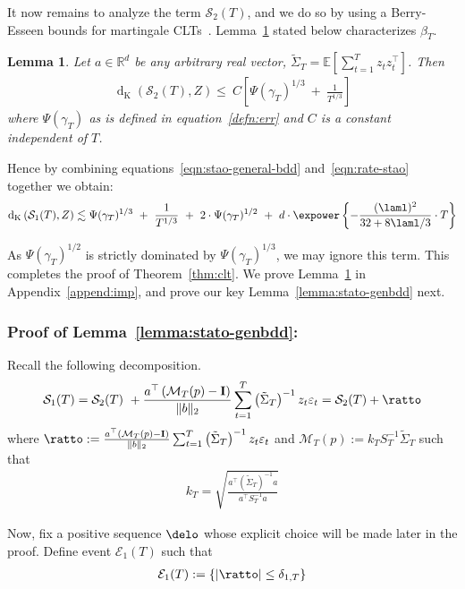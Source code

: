 \documentclass[11pt,letterpaper]{article}
\newcommand{\Exs}{\mathbb{E}}
\newcommand{\real}{\mathbb{R}}
\newcommand{\Id}{\mathbf{I}}
\newcommand{\z}{z}
\newcommand{\dist}{\operatorname{d}_{\operatorname{K}}}
\newcommand{\err}{\Psi(\gamma_T)}
\newcommand{\PT}{\tilde{\Sigma}_T}
\newcommand{\SigPinv}{ \left(\PT \right)^{-1}}
\newcommand{\mtp}{S_T^{-1} \PT}
\newcommand{\stao}{\mathcal{S}_1(T)}
\newcommand{\stato}{\mathcal{S}_2(T)}
\newcommand{\MTP}{\mathcal{M}_T(p)}
\newcommand{\Eone}{\mathcal{E}_1(T)}
\theoremstyle{plain}
\newtheorem{lemma}{Lemma}
\theoremstyle{definition}  %
\begin{document}
\noindent It now remains to analyze the term $\stato$, and we do so by using a Berry-Esseen bounds for martingale CLTs~\citep{mourrat2013rate}. Lemma~\ref{lemma:rate-stao} stated below characterizes $\beta_T$.
\begin{lemma}\label{lemma:rate-stao}
    Let $a\in \real^d$ be any arbitrary real vector, $\PT = \Exs[\sum^T_{t=1}\z_t \z^{\top}_t]$. Then
    \begin{align}\label{eqn:rate-stao}
    \dist \left(\stato,Z \right)
        \leq  \ C \left[ \Psi(\gamma_T)^{1/3} \ + \ \frac{1}{T^{1/3}}  \right]
    \end{align}
where $\err$ as is defined in equation~\eqref{defn:err} and $C$ is a constant independent of $T$.
\end{lemma}


\noindent Hence by combining equations~\eqref{eqn:stao-general-bdd} and~\eqref{eqn:rate-stao} together we obtain:
\begin{align*}
  \dist \left(\stao, Z \right)
  \lesssim \Psi(\gamma_T)^{1/3} \ + \ \frac{1}{T^{1/3}}
  \ + \ 2 \cdot \err^{1/2} \ + \  d \cdot \expower\left\{ - \frac{(\laml)^2}{32 +  8\laml/3} \cdot  T\right\}
\end{align*}

\noindent As $\err^{1/2}$ is strictly dominated by $\err^{1/3}$, we may ignore this term. This completes the proof of Theorem~\ref{thm:clt}. We prove Lemma~\ref{lemma:rate-stao} in Appendix~\ref{append:imp}, and prove our key Lemma~\ref{lemma:stato-genbdd} next.

\subsubsection*{Proof of Lemma~\ref{lemma:stato-genbdd}:}



\noindent Recall the following decomposition.
\begin{align} 
    \stao = \stato \ + \frac{a^{\top} \left(\MTP-\Id  \right)}{ \| b\|_2} \sum^T_{t=1} \SigPinv\z_t  \varepsilon_t 
    = \stato + \ratto
\end{align}
where $\ratto :=  \frac{a^{\top} \left(\MTP-\Id  \right)}{ \| b\|_2} \sum^T_{t=1} \SigPinv\z_t  \varepsilon_t $ and $\MTP := k_T \mtp$ such that
\begin{align*}
  k_T = \sqrt{ \frac{a^{\top} \SigPinv a }{ a^{\top} S_T^{-1} a}}  
\end{align*}


\noindent Now, fix a positive sequence $\delo$  whose explicit choice will be made later in the proof. Define event $\mathcal{E}_1(T)$ such that
\begin{align}
     \Eone := \left\{ |\ratto| \leq \delta_{1,T} \right\}
\end{align}
\end{document}
